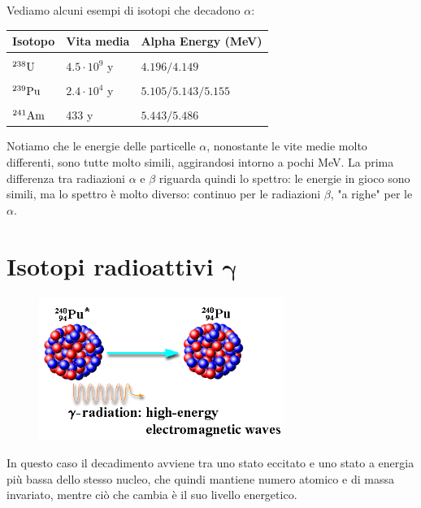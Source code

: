 Vediamo alcuni esempi di isotopi che decadono $\alpha$:

\begin{center}
    \begin{tabular}{|l|l|l|}
        \hline
        Isotopo & Vita media & Alpha Energy (MeV)\\
        \hline
        &&\\[-0.45cm]
        $\rm ^{238}U$ & $4.5 \cdot 10^9$ y & $4.196/4.149$\\
        \hline
        &&\\[-0.45cm]
        $\rm ^{239}Pu$ & $2.4 \cdot 10^4$ y & $5.105/5.143/5.155$\\
        \hline
        &&\\[-0.45cm]
        $\rm ^{241}Am$ & 433 y & $5.443/5.486$\\
        \hline
    \end{tabular}
\end{center}

Notiamo che le energie delle particelle $\alpha$, nonostante le vite medie molto differenti, sono tutte molto simili, aggirandosi intorno a pochi MeV. La prima differenza tra radiazioni $\alpha$ e $\beta$ riguarda quindi lo spettro: le energie in gioco sono simili, ma lo spettro è molto diverso: continuo per le radiazioni $\beta$, "a righe" per le $\alpha$.

\section[Isotopi radioattivi \texorpdfstring{$\gamma$}{\textgamma}]
{Isotopi radioattivi $\boldsymbol{\gamma}$}

\vspace{-0.6cm}\begin{figure}[H]
    \centering
    \includegraphics[width=8cm]{immagini/decadimento_gamma.png}
\end{figure}

\vspace{-0.4cm}In questo caso il decadimento avviene tra uno stato eccitato e uno stato a energia più bassa dello stesso nucleo, che quindi mantiene numero atomico e di massa invariato, mentre ciò che cambia è il suo livello energetico.

